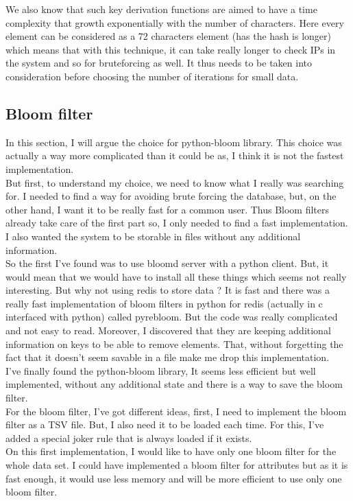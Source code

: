 \documentclass{eplmastersthesis}
\begin{document}
We also know that such key derivation functions are aimed to have a time complexity that growth exponentially with the number of characters. Here every element can be considered as a 72 characters element (has the hash is longer) which means that with this technique, it can take really longer to check IPs in the system and so for bruteforcing as well. It thus needs to be taken into consideration before choosing the number of iterations for small data.


\subsection{Bloom filter}
In this section, I will argue the choice for python-bloom library. This choice was actually a way more complicated than it could be as, I think it is not the fastest implementation.\\
But first, to understand my choice, we need to know what I really was searching for. I needed to find a way for avoiding brute forcing the database, but, on the other hand, I want it to be really fast for a common user. Thus Bloom filters already take care of the first part so, I only needed to find a fast implementation.\\
I also wanted the system to be storable in files without any additional information.\\
So the first I've found was to use bloomd server with a python client. But, it would mean that we would have to install all these things which seems not really interesting. But why not using redis to store data ? It is fast and there was a really fast implementation of bloom filters in python for redis (actually in c interfaced with python) called pyrebloom. But the code was really complicated and not easy to read. Moreover, I discovered that they are keeping additional information on keys to be able to remove elements. That, without forgetting the fact that it doesn't seem savable in a file make me drop this implementation.\\
I've finally found the python-bloom library, It seems less efficient but well implemented, without any additional state and there is a way to save the bloom filter.\\

For the bloom filter, I've got different ideas, first, I need to implement the bloom filter as a TSV file. But, I also need it to be loaded each time. For this, I've added a special joker rule that is always loaded if it exists.\\
On this first implementation, I would like to have only one bloom filter for the whole data set. I could have implemented a bloom filter for attributes but as it is fast enough, it would use less memory and will be more efficient to use only one bloom filter.\\
\end{document}

